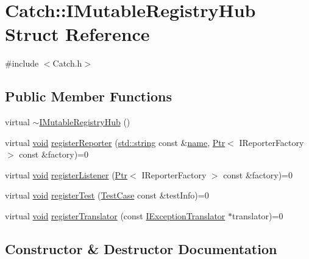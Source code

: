 \hypertarget{struct_catch_1_1_i_mutable_registry_hub}{}\section{Catch\+:\+:I\+Mutable\+Registry\+Hub Struct Reference}
\label{struct_catch_1_1_i_mutable_registry_hub}


{\ttfamily \#include $<$Catch.\+h$>$}

\subsection*{Public Member Functions}
\begin{DoxyCompactItemize}
\item 
virtual \hyperlink{struct_catch_1_1_i_mutable_registry_hub_a759ca1e044e19f905fb4d306f1367193}{$\sim$\+I\+Mutable\+Registry\+Hub} ()
\item 
virtual \hyperlink{_s_d_l__opengles2__gl2ext_8h_ae5d8fa23ad07c48bb609509eae494c95}{void} \hyperlink{struct_catch_1_1_i_mutable_registry_hub_aab72d0aa1fa14627f1a6a4c893ae0a12}{register\+Reporter} (\hyperlink{_s_d_l__opengl__glext_8h_ae84541b4f3d8e1ea24ec0f466a8c568b}{std\+::string} const \&\hyperlink{_s_d_l__opengl__glext_8h_aaced7cfc21e7d37775d6921bb8177239}{name}, \hyperlink{class_catch_1_1_ptr}{Ptr}$<$ I\+Reporter\+Factory $>$ const \&factory)=0
\item 
virtual \hyperlink{_s_d_l__opengles2__gl2ext_8h_ae5d8fa23ad07c48bb609509eae494c95}{void} \hyperlink{struct_catch_1_1_i_mutable_registry_hub_ae06fcb90ba3f2b389d450cd81e229276}{register\+Listener} (\hyperlink{class_catch_1_1_ptr}{Ptr}$<$ I\+Reporter\+Factory $>$ const \&factory)=0
\item 
virtual \hyperlink{_s_d_l__opengles2__gl2ext_8h_ae5d8fa23ad07c48bb609509eae494c95}{void} \hyperlink{struct_catch_1_1_i_mutable_registry_hub_a11b85c6744d88c9f83fe16ad4a8dd451}{register\+Test} (\hyperlink{class_catch_1_1_test_case}{Test\+Case} const \&test\+Info)=0
\item 
virtual \hyperlink{_s_d_l__opengles2__gl2ext_8h_ae5d8fa23ad07c48bb609509eae494c95}{void} \hyperlink{struct_catch_1_1_i_mutable_registry_hub_ae6825365102693cf7707db022a2c2b49}{register\+Translator} (const \hyperlink{struct_catch_1_1_i_exception_translator}{I\+Exception\+Translator} $\ast$translator)=0
\end{DoxyCompactItemize}


\subsection{Constructor \& Destructor Documentation}

